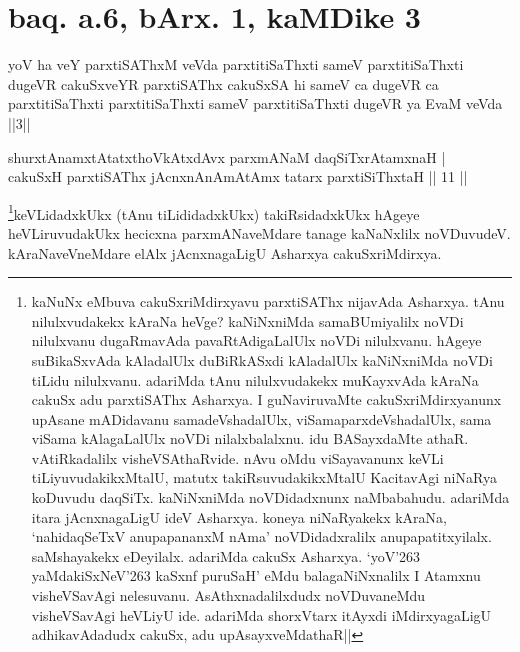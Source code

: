 \section*{baq. a.6, bArx. 1, kaMDike 3}

\begin{shl}
yoV ha veY parxtiSAThxM veVda parxtitiSaThxti sameV parxtitiSaThxti dugeVR cakuSxveYR parxtiSAThx cakuSxSA hi sameV ca dugeVR ca parxtitiSaThxti parxtitiSaThxti sameV parxtitiSaThxti dugeVR ya EvaM veVda ||3||
\end{shl}


\begin{shl}
shurxtAnamxtAtatxthoVkAtxdAvx parxmANaM daqSiTxrAtamxnaH | \\
cakuSxH parxtiSAThx jAcnxnAnAmAtAmx tatarx parxtiSiThxtaH \hfill|| 11 || 
\end{shl}

\begin{artha} 
\footnote[2]{kaNuNx eMbuva cakuSxriMdirxyavu parxtiSAThx nijavAda 
Asharxya. tAnu nilulxvudakekx kAraNa heVge? kaNiNxniMda samaBUmiyalilx 
noVDi nilulxvanu dugaRmavAda pavaRtAdigaLalUlx noVDi nilulxvanu. 
hAgeye suBikaSxvAda kAladalUlx duBiRkASxdi kAladalUlx kaNiNxniMda 
noVDi tiLidu nilulxvanu. adariMda tAnu nilulxvudakekx muKayxvAda 
kAraNa cakuSx adu parxtiSAThx Asharxya. I guNaviruvaMte 
cakuSxriMdirxyanunx upAsane mADidavanu samadeVshadalUlx, 
viSamaparxdeVshadalUlx, sama viSama kAlagaLalUlx noVDi nilalxbalalxnu. 
idu BASayxdaMte athaR. vAtiRkadalilx visheVSAthaRvide. nAvu oMdu 
viSayavanunx keVLi tiLiyuvudakikxMtalU, matutx takiRsuvudakikxMtalU 
KacitavAgi niNaRya koDuvudu daqSiTx. kaNiNxniMda noVDidadxnunx 
naMbabahudu. adariMda itara jAcnxnagaLigU ideV Asharxya. koneya 
niNaRyakekx kAraNa, `nahidaqSeTxV anupapananxM nAma' noVDidadxralilx 
anupapatitxyilalx. saMshayakekx eDeyilalx. adariMda cakuSx Asharxya. 
`yoV\char'263 yaMdakiSxNeV\char'263 kaSxnf puruSaH' eMdu 
balagaNiNxnalilx I Atamxnu visheVSavAgi nelesuvanu. AsAthxnadalilxdudx 
noVDuvaneMdu visheVSavAgi heVLiyU ide. adariMda shorxVtarx itAyxdi 
iMdirxyagaLigU adhikavAdadudx cakuSx, adu upAsayxveMdathaR||}keVLidadxkUkx (tAnu tiLididadxkUkx) takiRsidadxkUkx 
hAgeye heVLiruvudakUkx hecicxna parxmANaveMdare tanage kaNaNxlilx 
noVDuvudeV. kAraNaveVneMdare elAlx jAcnxnagaLigU Asharxya 
cakuSxriMdirxya.
\end{artha}


